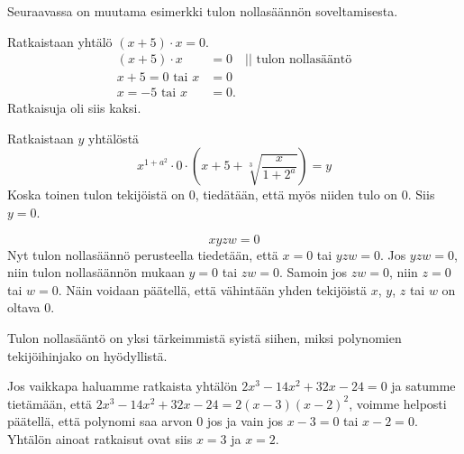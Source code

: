 
Seuraavassa on muutama esimerkki tulon nollasäännön soveltamisesta.

\begin{esimerkki} Ratkaistaan yhtälö $(x+5) \cdot x =0 $.
	\begin{align*}
	(x+5)\cdot x &=0 \quad || \text{ tulon nollasääntö} \\
	x +5= 0 \text{ tai } x &=0 \\
	x= -5 \text{ tai } x &=0.
	\end{align*}
	Ratkaisuja oli siis kaksi.
\end{esimerkki}


\begin{esimerkki} Ratkaistaan $y$ yhtälöstä
	\[x^{1+a^2}\cdot 0\cdot\left(x+5+\sqrt[3]{\frac{x}{1+2^a}}\right)=y\]
	Koska toinen tulon tekijöistä on $0$, tiedätään, että myös niiden tulo on $0$.
	Siis $y=0$.
\end{esimerkki}

\begin{esimerkki}
	\[xyzw=0\]
	Nyt tulon nollasäännö perusteella tiedetään, että $x=0$ tai $yzw=0$. Jos $yzw=0$, niin tulon nollasäännön mukaan $y=0$ tai $zw=0$. Samoin jos $zw=0$, niin $z=0$ tai $w=0$. Näin voidaan päätellä, että vähintään yhden tekijöistä $x$, $y$, $z$ tai $w$ on oltava $0$.
\end{esimerkki}


Tulon nollasääntö on yksi tärkeimmistä syistä siihen, miksi polynomien tekijöihinjako on hyödyllistä.

Jos vaikkapa haluamme ratkaista yhtälön $2x^3-14x^2+32x-24=0$ ja satumme tietämään, että $2x^3-14x^2+32x-24=2(x-3)(x-2)^2$,
voimme helposti päätellä, että polynomi saa arvon $0$ jos ja vain jos $x-3=0$ tai $x-2=0$. Yhtälön ainoat ratkaisut ovat siis $x=3$ ja $x=2$.

